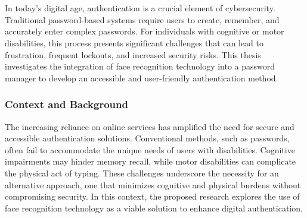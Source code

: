 
\chapter{}%
\label{ch:inleiding}

In today's digital age, authentication is a crucial element of cybersecurity. Traditional password-based systems require users to create, remember, and accurately enter complex passwords. For individuals with cognitive or motor disabilities, this process presents significant challenges that can lead to frustration, frequent lockouts, and increased security risks. This thesis investigates the integration of face recognition technology into a password manager to develop an accessible and user-friendly authentication method.

\subsection{Context and Background}
The increasing reliance on online services has amplified the need for secure and accessible authentication solutions. Conventional methods, such as passwords, often fail to accommodate the unique needs of users with disabilities. Cognitive impairments may hinder memory recall, while motor disabilities can complicate the physical act of typing. These challenges underscore the necessity for an alternative approach, one that minimizes cognitive and physical burdens without compromising security. In this context, the proposed research explores the use of face recognition technology as a viable solution to enhance digital authentication.

